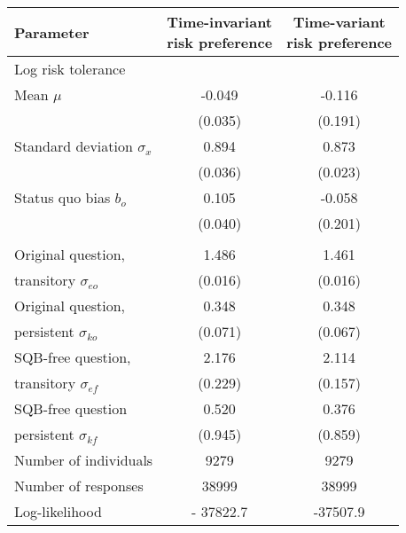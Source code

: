 {
\begin{tabular}{l *{2}{c}}
	\toprule
	\textbf{Parameter} & \thead{Time-invariant\\ risk preference} & \thead{Time-variant\\ risk preference} \\
	\midrule
	\multicolumn{3}{l}{Log risk tolerance}\\
	\hspace{2em} Mean $\mu$ & -0.049 & -0.116 \\
	 & (0.035) & (0.191) \\
	\hspace{2em} Standard deviation $\sigma_x$ & 0.894 & 0.873 \\
	 & (0.036) & (0.023) \\
	Status quo bias $b_o$ & 0.105 & -0.058 \\
	& (0.040) & (0.201) \\
	
	\addlinespace 
	\multicolumn{3}{l}{Response error standard deviation}\\
	\hspace{2em} Original question, & 1.486 & 1.461 \\
	\hspace{3em} transitory $\sigma_{eo}$ & (0.016) & (0.016) \\
	\hspace{2em} Original question, & 0.348 & 0.348 \\
	\hspace{3em} persistent $\sigma_{ko}$ & (0.071) & (0.067) \\
	\hspace{2em} SQB-free question,  & 2.176 & 2.114 \\
	\hspace{3em} transitory $\sigma_{ef}$ & (0.229) & (0.157) \\
	\hspace{2em} SQB-free question & 0.520 & 0.376 \\
	\hspace{3em} persistent $\sigma_{kf}$ & (0.945) & (0.859) \\
	\midrule
	Number of individuals & 9279 & 9279 \\
	Number of responses & 38999 & 38999 \\
	Log-likelihood & - 37822.7 & -37507.9 \\
	\bottomrule
\end{tabular}
}